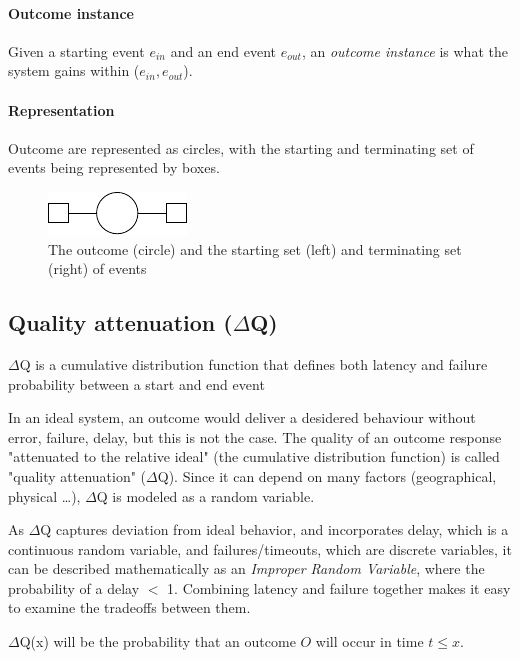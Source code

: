     \paragraph{Outcome instance}
    Given a starting event $e_{in}$ and an end event $e_{out}$, an \textit{outcome instance} is what the system gains within ($e_{in}, e_{out}$). 

    \paragraph{Representation}
    Outcome are represented as circles, with the starting and terminating set of events being represented by boxes.
    \begin{figure}[H]
        \begin{center}
            \includegraphics[scale=1.3]{tikz/outcome.pdf}
        \end{center}
        \caption{The outcome (circle) and the starting set (left) and terminating set (right) of events}
    \end{figure}

\subsection{Quality attenuation ($\Delta$Q)}
        $\Delta$Q is a cumulative distribution function that defines both latency and failure probability between a start and end event \cite{dq-tut}

        In an ideal system, an outcome would deliver a desidered behaviour without error, failure, delay, but this is not the case. The quality of an outcome response "attenuated to the relative ideal" (the cumulative distribution function) is called "quality attenuation" ($\Delta$Q). Since it can depend on many factors (geographical, physical \dots), $\Delta$Q is modeled as a random variable.

    As $\Delta$Q captures deviation from ideal behavior, and incorporates delay, which is a continuous random variable, and failures/timeouts, which are discrete variables, it can be described mathematically as an \textit{Improper Random Variable}, where the probability of a delay $<$ 1. Combining latency and failure together makes it easy to examine the tradeoffs between them.

    $\Delta$Q(x) will be the probability that an outcome $O$ will occur in time $t \le x$.

